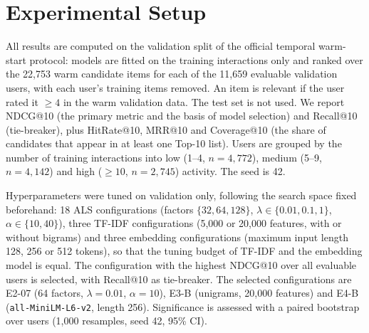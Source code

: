%

\section{Experimental Setup}
\label{sec:setup}
All results are computed on the validation split of the official temporal warm-start
protocol: models are fitted on the training interactions only and ranked over the
22{,}753 warm candidate items for each of the 11{,}659 evaluable validation users, with
each user's training items removed. An item is relevant if the user rated it $\geq 4$ in the
warm validation data. The test set is not used. We report NDCG@10 (the primary metric and the
basis of model selection) and Recall@10 (tie-breaker), plus HitRate@10, MRR@10 and
Coverage@10 (the share of candidates that appear in at least one Top-10 list). Users are
grouped by the number of training interactions into low (1--4, $n=4{,}772$), medium (5--9,
$n=4{,}142$) and high ($\geq 10$, $n=2{,}745$) activity. The seed is 42.

Hyperparameters were tuned on validation only, following the search space fixed beforehand:
18 ALS configurations (factors $\{32,64,128\}$, $\lambda\in\{0.01,0.1,1\}$,
$\alpha\in\{10,40\}$), three TF-IDF configurations (5{,}000 or 20{,}000 features, with or
without bigrams) and three embedding configurations (maximum input length 128, 256 or 512 tokens),
so that the tuning budget of TF-IDF and the embedding model is equal. The configuration with the
highest NDCG@10 over all evaluable users is selected, with Recall@10 as tie-breaker. The
selected configurations are E2-07 (64 factors, $\lambda=0.01$, $\alpha=10$), E3-B (unigrams,
20{,}000 features) and E4-B (\texttt{all-MiniLM-L6-v2}, length 256). Significance is assessed
with a paired bootstrap over users (1{,}000 resamples, seed 42, 95\% CI).

